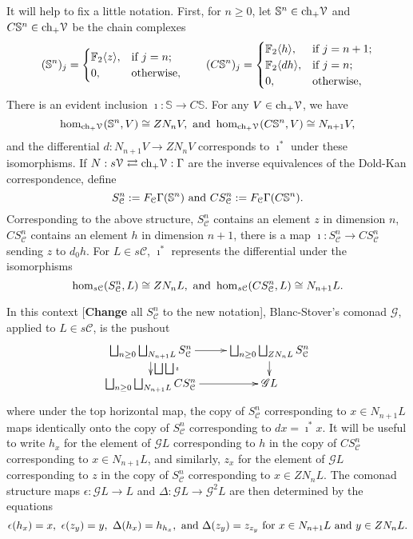 \documentclass[11pt]{amsart}
\theoremstyle{plain}
\theoremstyle{definition}
\renewcommand{\to}{\longrightarrow}
\newcommand{\scrG}{\mathscr{G}}
\newcommand{\calC}{\mathcal{C}}
\newcommand{\calV}{\mathcal{V}}
\theoremstyle{plain}
\newcommand{\vect}[2]{\calV^{#1}_{#2}}
\newcommand{\BSW}{{\scrG}}
\newcommand{\F}{\mathbb{F}}
\begin{document}
\begin{Composite functor spectral sequences}
\begin{shaded}\tiny
It will help to fix a little notation. First, for $n\geq0$, let $\mathbb{S}^n\in \textup{ch}_+ \vect{}{}$ and $C\mathbb{S}^n\in \textup{ch}_+ \vect{}{}$ be the chain complexes
\[(\mathbb{S}^n)_j=\begin{cases}
\F_2\langle z\rangle,&\textup{if }j=n;\\
0,&\textup{otherwise},
\end{cases}\qquad 
(C\mathbb{S}^n)_j=\begin{cases}
\F_2\langle h\rangle,&\textup{if }j=n+1;\\
\F_2\langle dh\rangle,&\textup{if }j=n;\\
0,&\textup{otherwise},
\end{cases}
\]
There is an evident inclusion $\imath:\mathbb{S}\to C\mathbb{S}$. For any $V\in\textup{ch}_+\vect{}{}$, we have
\[\hom_{\textup{ch}_+\vect{}{}}(\mathbb{S}^n,V)\cong ZN_nV,\textup{ and }\hom_{\textup{ch}_+\vect{}{}}(C\mathbb{S}^n,V)\cong N_{n+1}V,\]
and the differential $d:N_{n+1}V\to ZN_nV$ corresponds to $\imath^*$ under these isomorphisms. If $N:s\vect{}{}\rightleftarrows \textup{ch}_+ \vect{}{}
:\Gamma$ are the inverse equivalences of the Dold-Kan correspondence, define
\[S^n_{\calC}:=F_{\calC}\Gamma(\mathbb{S}^n)\textup{ and }CS^n_{\calC}:=F_{\calC}\Gamma(C\mathbb{S}^n).\]
Corresponding to the above structure, $S^n_{\calC}$ contains an element $z$ in dimension $n$, $CS^n_{\calC}$ contains an element $h$ in dimension $n+1$, there is a map $\imath:S^n_{\calC}\to CS^n_{\calC}$ sending $z$ to $d_0h$. For $L\in s\calC$, $\imath^*$ represents the differential under the isomorphisms
\[\hom_{s\calC}(S_\calC^n,L)\cong ZN_nL,\textup{ and }\hom_{s\calC}(CS_\calC^n,L)\cong N_{n+1}L.\]
\end{shaded}

In this context [\textbf{Change} all $S_\calC^n$ to the new notation], Blanc-Stover's comonad $\BSW$, applied to $L\in s\calC$, is the pushout
\[\xymatrix@R=4mm{
\bigsqcup_{n\geq0}\bigsqcup_{N_{n+1}L}S_\calC^n
\ar[r]\ar[d]^-{\bigsqcup\bigsqcup\imath}
&%
\bigsqcup_{n\geq0}\bigsqcup_{ZN_{n}L}S_\calC^n\ar[d]\\%
\bigsqcup_{n\geq0}\bigsqcup_{N_{n+1}L}CS_\calC^n
\ar[r]&%
\BSW L%
}\]
where under the top horizontal map, the copy of $S^n_\calC$ corresponding to $x\in N_{n+1}L$ maps identically onto the copy of $S^n_\calC$ corresponding to $dx=\imath^*x$. It will be useful to write $h_x$ for the element of $\BSW L$ corresponding to $h$ in the copy of $CS^n_\calC$ corresponding to $x\in N_{n+1}L$, and similarly, $z_x$ for the element of $\BSW L$ corresponding to $z$ in the copy of $S^n_\calC$ corresponding to $x\in ZN_{n}L$. The comonad structure maps $\epsilon:\BSW L\to L$ and $\Delta:\BSW L\to \BSW^2L$ are then determined by the equations
\[\epsilon(h_x)=x,\ \epsilon(z_y)=y,\ \Delta(h_x)=h_{h_x},\textup{ and }\Delta(z_y)=z_{z_y}\textup{ for $x\in N_{n+1}L$ and $y\in ZN_nL$.}\]


\end{Composite functor spectral sequences}
\end{document}
